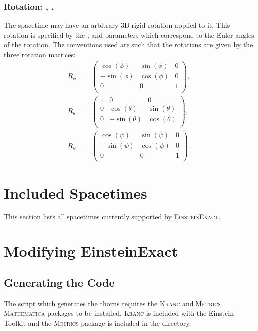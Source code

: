 \documentclass{article}
\begin{document}
\subsubsection{Rotation: , , }
The spacetime may have an arbitrary $3$D rigid rotation applied to it. This
rotation is specified by the ,  and  parameters
which correspond to the Euler angles of the rotation. The conventions used are
such that the rotations are given by the three rotation matrices:
\begin{align}
R_\phi =& 
\left(
\begin{array}{ccc}
 \cos (\phi ) & \sin (\phi ) & 0 \\
 -\sin (\phi ) & \cos (\phi ) & 0 \\
 0 & 0 & 1 \\
\end{array}
\right), \nonumber \\
R_\theta =&
\left(
\begin{array}{ccc}
 1 & 0 & 0 \\
 0 & \cos (\theta ) & \sin (\theta ) \\
 0 & -\sin (\theta ) & \cos (\theta ) \\
\end{array}
\right), \nonumber \\
R_\psi =&
\left(
\begin{array}{ccc}
 \cos (\psi ) & \sin (\psi ) & 0 \\
 -\sin (\psi ) & \cos (\psi ) & 0 \\
 0 & 0 & 1 \\
\end{array}
\right).
\end{align}

\section{Included Spacetimes}

This section lists all spacetimes currently supported by \textsc{EinsteinExact}.



\section{Modifying EinsteinExact}

\subsection{Generating the Code}
The script which generates the thorns requires the \textsc{Kranc} and
\textsc{Metrics} \textsc{Mathematica} packages to be installed. \textsc{Kranc}
is included with the Einstein Toolkit and the \textsc{Metrics} package is
included in the  directory.
\end{document}

